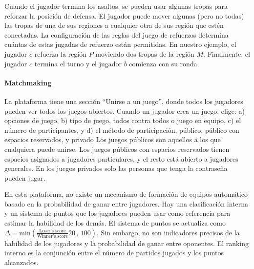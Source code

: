 \documentclass[a4paper,11pt]{book}
\theoremstyle{definition}
\begin{document}
Cuando el jugador termina los asaltos, se pueden usar algunas tropas para reforzar la posición de defensa.
%
El jugador puede mover algunas (pero no todas) las tropas de una de sus regiones a cualquier otra de sus región que estén conectadas.
%
La configuración de las reglas del juego de refuerzos determina cuántas de estas jugadas de refuerzo están permitidas.
%
En nuestro ejemplo, el jugador $c$ refuerza la región $P$ moviendo dos tropas de la región $M$.
%
Finalmente, el jugador $c$ termina el turno y el jugador $b$ comienza con su ronda.

\paragraph{Matchmaking}

La plataforma tiene una sección ``Unirse a un juego'', donde todos los jugadores pueden ver todos los juegos abiertos.
%
Cuando un jugador crea un juego, elige: a) opciones de juego, b) tipo de juego, todos contra todos o juego en equipo, c) el número de participantes, y d) el método de participación, público, público con espacios reservados, y privado
%
Los juegos públicos son aquellos a los que cualquiera puede unirse.
%
Los juegos públicos con espacios reservados tienen espacios asignados a jugadores particulares, y el resto está abierto a jugadores generales.
%
En los juegos privados solo las personas que tenga la contraseña pueden jugar.


En esta plataforma, no existe un mecanismo de formación de equipos automático basado en la probabilidad de ganar entre jugadores.
%
Hay una clasificación interna y un sistema de puntos que los jugadores pueden usar como referencia para estimar la habilidad de los demás.
%
El sistema de puntos se actualiza como {\small $\Delta = \text{min}(\frac{\text{Loser's score}}{\text{Winner's score}}20\,,\,100 )$}.
%
Sin embargo, no son indicadores precisos de la habilidad de los jugadores y la probabilidad de ganar entre oponentes.
%
El ranking interno es la conjunción entre el número de partidos jugados y los puntos alcanzados.

\end{document}
